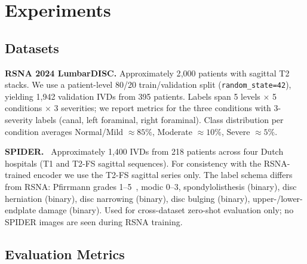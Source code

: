 \documentclass[conference]{IEEEtran}
\begin{document}
\section{Experiments}
\label{sec:exp}

\subsection{Datasets}

\textbf{RSNA 2024 LumbarDISC.} Approximately 2{,}000 patients with
sagittal T2 stacks. We use a patient-level 80/20 train/validation split
(\verb|random_state=42|), yielding 1{,}942 validation IVDs from 395
patients. Labels span 5 levels $\times$ 5 conditions $\times$ 3
severities; we report metrics for the three conditions with
3-severity labels (canal, left foraminal, right foraminal). Class
distribution per condition averages Normal/Mild $\approx 85\%$,
Moderate $\approx 10\%$, Severe $\approx 5\%$.

\textbf{SPIDER.}~\cite{vandergraaf2024spider} Approximately 1{,}400
IVDs from 218 patients across four Dutch hospitals (T1 and T2-FS
sagittal sequences). For consistency with the RSNA-trained encoder we
use the T2-FS sagittal series only. The label schema differs from
RSNA: Pfirrmann grades 1--5~\cite{pfirrmann2001}, modic 0--3,
spondylolisthesis (binary), disc herniation (binary), disc narrowing
(binary), disc bulging (binary), upper-/lower-endplate damage
(binary). Used for cross-dataset zero-shot evaluation only; no SPIDER
images are seen during RSNA training.

\subsection{Evaluation Metrics}
\end{document}
